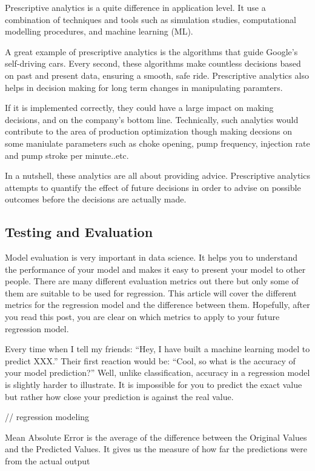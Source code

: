 Prescriptive analytics is a quite difference in application level. It use a combination of techniques and tools such as simulation studies, computational modelling procedures, and machine learning (ML).

A great example of prescriptive analytics is the algorithms that guide Google’s self-driving cars. Every second, these algorithms make countless decisions based on past and present data, ensuring a smooth, safe ride. Prescriptive analytics also helps in decision making for long term changes in manipulating paramters.

If it is implemented correctly, they could have a large impact on making decisions, and on the company’s bottom line. Technically, such analytics would contribute to the area of production optimization though making decsions on some maniulate parameters such as choke opening, pump frequency, injection rate and pump stroke per minute..etc.

In a nutshell, these analytics are all about providing advice. Prescriptive analytics attempts to quantify the effect of future decisions in order to advise on possible outcomes before the decisions are actually made. 

\subsection{Testing and Evaluation}
Model evaluation is very important in data science. It helps you to understand the performance of your model and makes it easy to present your model to other people. There are many different evaluation metrics out there but only some of them are suitable to be used for regression. This article will cover the different metrics for the regression model and the difference between them. Hopefully, after you read this post, you are clear on which metrics to apply to your future regression model.

Every time when I tell my friends: “Hey, I have built a machine learning model to predict XXX.” Their first reaction would be: “Cool, so what is the accuracy of your model prediction?” Well, unlike classification, accuracy in a regression model is slightly harder to illustrate. It is impossible for you to predict the exact value but rather how close your prediction is against the real value.

// regression modeling

Mean Absolute Error is the average of the difference between the Original Values and the Predicted Values. It gives us the measure of how far the predictions were from the actual output

